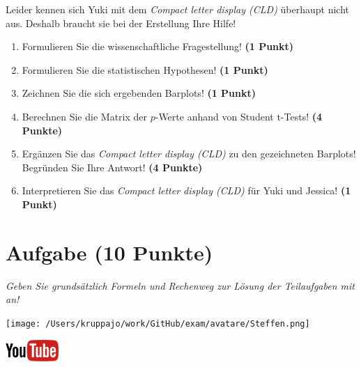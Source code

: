 \documentclass[a4paper, 9pt]{scrartcl}\usepackage[]{graphicx}\usepackage[]{xcolor}
\begin{document}
Leider kennen sich Yuki mit dem \textit{Compact letter display (CLD)} überhaupt nicht aus. Deshalb braucht sie bei der Erstellung Ihre Hilfe!

\begin{enumerate}
  \item Formulieren Sie die wissenschaftliche Fragestellung! \textbf{(1 Punkt)}
  \item Formulieren Sie die statistischen Hypothesen! \textbf{(1 Punkt)}
\item Zeichnen Sie die sich ergebenden Barplots! \textbf{(1 Punkt)}
\item Berechnen Sie die Matrix der $p$-Werte anhand von Student t-Tests! \textbf{(4 Punkte)}
\item Ergänzen Sie das \textit{Compact letter display (CLD)} zu den gezeichneten Barplots! Begründen Sie Ihre Antwort! \textbf{(4 Punkte)}
\item Interpretieren Sie das \textit{Compact letter display (CLD)} für Yuki und Jessica! \textbf{(1 Punkt)} 
\end{enumerate}

 
\clearpage

\section{Aufgabe \hfill (10 Punkte)}

\textit{Geben Sie grundsätzlich Formeln und Rechenweg zur Lösung der Teilaufgaben mit an!} \\[1Ex]
 

 
\begin{minipage}[t]{0.5\textwidth}
\texttt{[image: /Users/kruppajo/work/GitHub/exam/avatare/Steffen.png]}
\end{minipage}
\begin{minipage}[t]{0.5\textwidth}
\hfill
\href{https://youtu.be/RagTFFKFbFg}{\includegraphics[width = 2cm]{img/youtube}}
\end{minipage}
\vspace{1ex}
\end{document}
